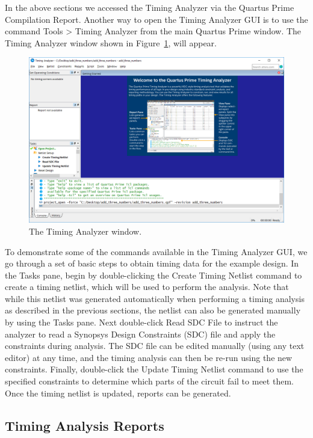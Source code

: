 \documentclass[11pt, twoside, pdftex]{article}
\begin{document}
In the above sections we accessed the Timing Analyzer via the Quartus Prime Compilation Report. Another
way to open the Timing Analyzer GUI is to use the command {\sf Tools > Timing Analyzer}
from the main Quartus Prime window. The Timing Analyzer window shown in Figure~\ref{fig:5}, will appear.

\begin{figure}[H]
\begin{center}
\includegraphics[scale=0.5]{figures/figure5.png}
\end{center}
\caption{The Timing Analyzer window.}
\label{fig:5}
\end{figure}

To demonstrate some of the commands available in the Timing Analyzer GUI, we go through a set of basic 
steps to obtain timing data for the example design. In the Tasks pane, begin by double-clicking
the {\sf Create Timing Netlist} command to create a timing netlist, which will be used to perform 
the analysis. Note that while this netlist was generated automatically when performing a timing 
analysis as described in the previous sections, the netlist can also be generated manually 
by using the Tasks pane. Next double-click {\sf Read SDC File} to instruct the analyzer to 
read a Synopsys Design Constraints (SDC) file and apply the constraints during analysis.
The SDC file can be edited manually (using any text editor) at any time, and the timing
analysis can then be re-run using the new constraints. 
Finally, double-click the {\sf Update Timing Netlist} command to use the specified 
constraints to determine which parts of the circuit fail 
to meet them. Once the timing netlist is updated, reports can be generated.

\subsection{Timing Analysis Reports}
\end{document}
